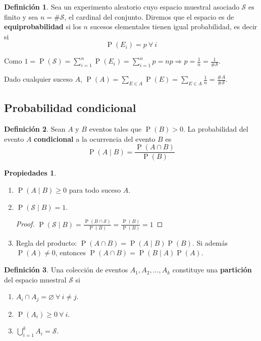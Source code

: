 \documentclass[11pt]{article}
\theoremstyle{plain}
\theoremstyle{definition}
\newtheorem*{defi}{Definición}
\newtheorem*{props}{Propiedades}
\theoremstyle{remark}
\newcommand{\deft}[1]{\textbf{#1}}  %
\newcommand{\proba}{\ensuremath{\operatorname{P}}}  %
\newcommand{\espm}[0]{\ensuremath{\mathcal{S}}}  %
\newcommand{\foralle}{\ensuremath{\forall \ }}  %
\begin{document}
  \begin{defi}
    Sea un experimento aleatorio cuyo espacio muestral asociado $\espm$ es finito y sea $n = \# \espm$, el cardinal del conjunto. Diremos que el espacio es de \deft{equiprobabilidad} si los $n$ sucesos elementales tienen igual probabilidad, es decir si
    \[ \proba(E_i) = p \ \foralle i \]
  \end{defi}

  Como $1 = \proba(\espm) = \sum_{i=1}^n \proba(E_i) = \sum_{i=1}^n p = np \Rightarrow p = \frac{1}{n} = \frac{1}{\#\espm}$.

  Dado cualquier suceso $A$, $\proba(A) = \sum_{E \in A} \proba(E) = \sum_{E \in A} \frac{1}{n} = \frac{\#A}{\#\espm}$.

  \subsection{Probabilidad condicional}
    \begin{defi}
      Sean $A$ y $B$ eventos tales que $\proba(B) > 0$. La probabilidad del evento $A$ \deft{condicional} a la ocurrencia del evento $B$ es
      \[ \proba(A \mid B) = \frac{\proba(A \cap B)}{\proba(B)} \]
    \end{defi}

    \begin{props} \
      \begin{enumerate}
        \item $\proba(A \mid B) \geq 0$ para todo suceso $A$.
        \item $\proba(\espm \mid B) = 1$.
        \begin{proof}
          $\proba(\espm \mid B) = \frac{\proba(B \cap \espm)}{\proba(B)} = \frac{\proba(B)}{\proba(B)} = 1$
        \end{proof}
        \item Regla del producto: $\proba(A \cap B) = \proba(A \mid B) \proba(B)$. Si además $\proba(A) \neq 0$, entonces $\proba(A \cap B) = \proba(B \mid A) \proba(A)$.
      \end{enumerate}
    \end{props}

    \begin{defi}
      Una colección de eventos $A_1, A_2, \dots, A_k$ constituye una \deft{partición} del espacio muestral $\espm$ si
      \begin{enumerate}
        \item $A_i \cap A_j = \varnothing \ \foralle i \neq j$.
        \item $\proba(A_i) \geq 0 \ \foralle i$.
        \item $\bigcup_{i=1}^k A_i = \espm$.
      \end{enumerate}
    \end{defi}
\end{document}
